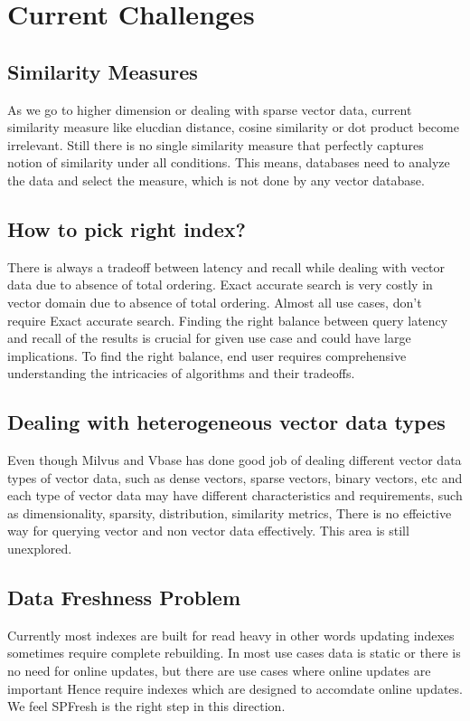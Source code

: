 \documentclass[conference]{IEEEtran}
\begin{document}
\section{Current Challenges}
\subsection{Similarity Measures}
As we go to higher dimension or dealing with sparse vector data, current similarity measure like elucdian distance, cosine similarity or dot product become irrelevant. Still there is no single similarity measure that perfectly captures notion of similarity under all conditions.   This means, databases need to analyze the data and select the measure, which is not done by any vector database.

\subsection{How to pick right index?}

There is always a tradeoff between latency and recall while dealing with vector data due to absence of total ordering.
Exact accurate search is very costly in vector domain due to absence of total ordering. Almost all use cases, don’t require Exact accurate search.
Finding the right balance between query latency and recall of the results is crucial for given use case and could have large implications.  To find the right balance, end user requires comprehensive understanding the intricacies of algorithms and their tradeoffs.
\subsection{Dealing with heterogeneous vector data types}
Even though Milvus and Vbase has done good job of dealing different vector data types of vector data, such as dense vectors, sparse vectors, binary vectors, etc and each type of vector data may have different characteristics and requirements, such as dimensionality, sparsity, distribution, similarity metrics, There is no effeictive way for querying vector and non vector data effectively. This area is still unexplored.  

\subsection{Data Freshness Problem}
Currently most indexes are built for read heavy in other words updating indexes sometimes require complete rebuilding. In most use cases data is static or there is no need for online updates, but there are use cases where online updates are important Hence require indexes which are designed to accomdate online updates. We feel SPFresh is the right step in this direction.
\end{document}
